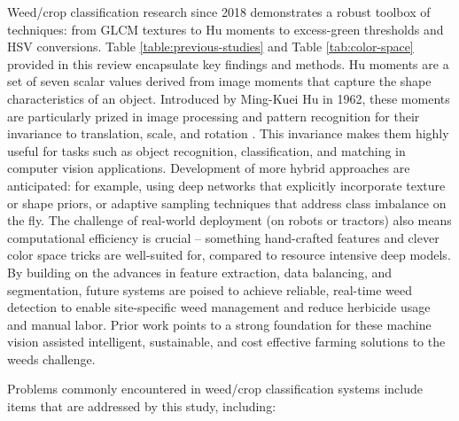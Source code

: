 \documentclass[letterpaper]{report}
\begin{document}
%
Weed/crop classification research since 2018 demonstrates a robust toolbox of techniques: from GLCM textures to Hu moments to excess-green thresholds and HSV conversions. Table \ref{table:previous-studies} and Table \ref{tab:color-space} provided in this review encapsulate key findings and methods. Hu moments are a set of seven scalar values derived from image moments that capture the shape characteristics of an object. Introduced by Ming-Kuei Hu in 1962, these moments are particularly prized in image processing and pattern recognition for their invariance to translation, scale, and rotation \cite{Hu1962-dq}. This invariance makes them highly useful for tasks such as object recognition, classification, and matching in computer vision applications. Development of more hybrid approaches are anticipated: for example, using deep networks that explicitly incorporate texture or shape priors, or adaptive sampling techniques that address class imbalance on the fly. The challenge of real-world deployment (on robots or tractors) also means computational efficiency is crucial – something hand-crafted features and clever color space tricks are well-suited for, compared to resource intensive deep models. By building on the advances in feature extraction, data balancing, and segmentation, future systems are poised to achieve reliable, real-time weed detection to enable site-specific weed management and reduce herbicide usage and manual labor. Prior work points to  a strong foundation for these machine vision assisted intelligent, sustainable, and cost effective farming solutions to the weeds challenge.
%
%

Problems commonly encountered in weed/crop classification systems include items that are addressed by this study, including:
\end{document}
